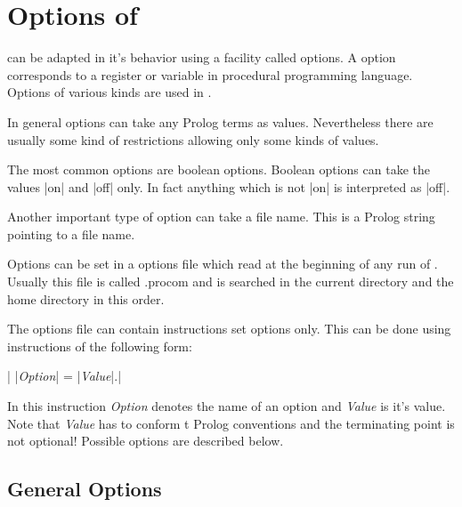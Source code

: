 
\section{Options of \ProCom}\label{sec:options}

\ProCom{} can be adapted in it's behavior using a facility called options. A
option corresponds to a register or variable in procedural programming
language. Options of various kinds are used in \ProCom.

In general options can take any Prolog terms as values. Nevertheless there are
usually some kind of restrictions allowing only some kinds of values.

The most common options are boolean options. Boolean options can take the
values |on| and |off| only. In fact anything which is not |on| is interpreted
as |off|.

Another important type of option can take a file name. This is a Prolog string
pointing to a file name.

Options can be set in a options file which read at the beginning of any run of
\ProCom. Usually this file is called {\sf .procom} and is searched in the
current directory and the home directory in this order.

The \ProCom{} options file can contain instructions set options only.
This can be done using instructions of the following form:

|  |{\em Option}| = |{\em Value}|.|

In this instruction {\em Option}\/ denotes the name of an option and {\em
Value}\/ is it's value. Note that {\em Value} has to conform t Prolog
conventions and the terminating point is not optional! Possible options are
described below.


\subsection{General Options}

